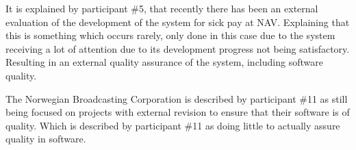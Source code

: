 
It is explained by participant \#5, that recently there has been an external evaluation of the development of the system for sick pay at NAV. Explaining that this is something which occurs rarely, only done in this case due to the system receiving a lot of attention due to its development progress not being satisfactory. Resulting in an external quality assurance of the system, including software quality.


The Norwegian Broadcasting Corporation is described by participant \#11 as still being focused on projects with external revision to ensure that their software is of quality. Which is described by participant \#11 as doing little to actually assure quality in software.




